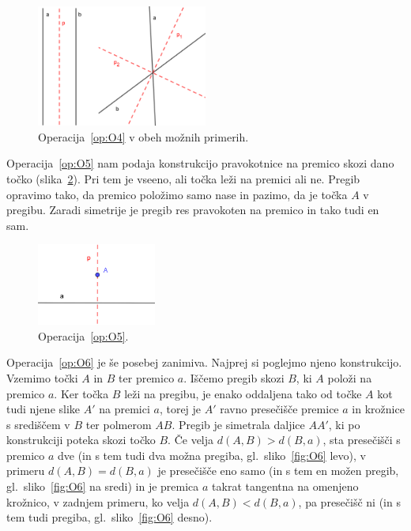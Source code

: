 \begin{figure}[h]
    \centering
    \includegraphics[width=0.5\textwidth]{images/origami_operacije/O4.png}
    \caption[Operacija~\ref{op:O4}]{Operacija~\ref{op:O4} v obeh možnih primerih.}
    \label{fig:O4}
\end{figure}

Operacija~\ref{op:O5} nam podaja konstrukcijo pravokotnice na premico skozi dano točko (slika~\ref{fig:O5}). Pri tem je vseeno, ali točka leži na premici ali ne. Pregib opravimo tako, da premico položimo samo nase in pazimo, da je točka $A$ v pregibu. Zaradi simetrije je pregib res pravokoten na premico in tako tudi en sam.

\begin{figure}[h]
    \centering
    \includegraphics[width=0.35\textwidth]{images/origami_operacije/O5.png}
    \caption[Operacija~\ref{op:O5}]{Operacija~\ref{op:O5}.}
    \label{fig:O5}
\end{figure}

Operacija~\ref{op:O6} je še posebej zanimiva. Najprej si poglejmo njeno konstrukcijo. Vzemimo točki $A$ in $B$ ter premico $a$. Iščemo pregib skozi $B$, ki $A$ položi na premico $a$. Ker točka $B$ leži na pregibu, je enako oddaljena tako od točke $A$ kot tudi njene slike $A'$ na premici $a$, torej je $A'$ ravno presečišče premice $a$ in krožnice s središčem v $B$ ter polmerom $AB$. Pregib je simetrala daljice $AA'$, ki po konstrukciji poteka skozi točko $B$. Če velja $ d(A,B) > d(B,a) $, sta presečišči s premico $a$ dve (in s tem tudi dva možna pregiba, gl.\ sliko~\ref{fig:O6} levo), v primeru $ d(A,B) = d(B,a) $ je presečišče eno samo (in s tem en možen pregib, gl.\ sliko~\ref{fig:O6} na sredi) in je premica $a$ takrat tangentna na omenjeno krožnico, v zadnjem primeru, ko velja $ d(A,B) < d(B,a) $, pa presečišč ni (in s tem tudi pregiba, gl.\ sliko~\ref{fig:O6} desno).

